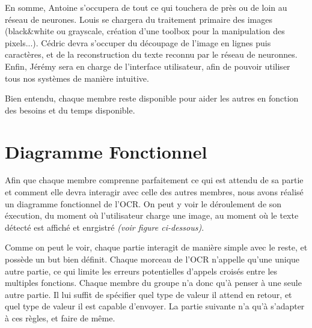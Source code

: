 \documentclass[12pt]{report}
\begin{document}
En somme, Antoine s'occupera de tout ce qui touchera de près ou de loin au réseau de neurones. Louis se chargera du traitement primaire des images (black\&white ou grayscale, création d'une toolbox pour la manipulation des pixels...). Cédric devra s'occuper du découpage de l'image en lignes puis caractères, et de la reconstruction du texte reconnu par le réseau de neuronnes. Enfin, Jérémy sera en charge de l'interface utilisateur, afin de pouvoir utiliser tous nos systèmes de manière intuitive.

Bien entendu, chaque membre reste disponible pour aider les autres en fonction des besoins et du temps disponible.

\chapter{Diagramme Fonctionnel}

Afin que chaque membre comprenne parfaitement ce qui est attendu de sa partie et comment elle devra interagir avec celle des autres membres, nous avons réalisé un diagramme fonctionnel de l'OCR. On peut y voir le déroulement de son éxecution, du moment où l'utilisateur charge une image, au moment où le texte détecté est affiché et enrgistré \textit{(voir figure ci-dessous)}.

Comme on peut le voir, chaque partie interagit de manière simple avec le reste, et possède un but bien définit. Chaque morceau de l'OCR n'appelle qu'une unique autre partie, ce qui limite les erreurs potentielles d'appels croisés entre les multiples fonctions. Chaque membre du groupe n'a donc qu'à penser à une seule autre partie. Il lui suffit de spécifier quel type de valeur il attend en retour, et quel type de valeur il est capable d'envoyer. La partie suivante n'a qu'à s'adapter à ces règles, et faire de même.
\end{document}
